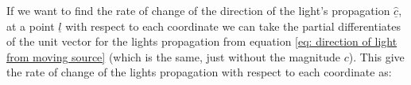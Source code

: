 If we want to find the rate of change of the direction of the light's propagation $\underline{\hat{c}}$, at a point $\underline{l}$ with respect to each coordinate we can take the partial differentiates of the unit vector for the lights propagation from equation \eqref{eq: direction of light from moving source} (which is the same, just without the magnitude $c$).
This give the rate of change of the lights propagation with respect to each coordinate as:

%
